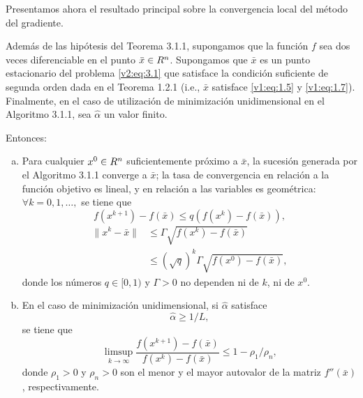 Presentamos ahora el resultado principal sobre la convergencia local del método del gradiente.

\begin{theorem}\label{v2:thm:3.1.4}
    Además de las hipótesis del Teorema 3.1.1, supongamos que la función $f$ sea dos veces diferenciable en el punto $\bar{x} \in R^n$. Supongamos que $\bar{x}$ es un punto estacionario del problema \eqref{v2:eq:3.1} que satisface la condición suficiente de segunda orden dada en el Teorema 1.2.1 (i.e., $\bar{x}$ satisface \eqref{v1:eq:1.5} y \eqref{v1:eq:1.7}). Finalmente, en el caso de utilización de minimización unidimensional en el Algoritmo 3.1.1, sea $\hat{\alpha}$ un valor finito.
    
    Entonces:
    \begin{enumerate}[(a)]
        \item Para cualquier $x^0 \in R^n$ suficientemente próximo a $\bar{x}$, la sucesión generada por el Algoritmo 3.1.1 converge a $\bar{x}$; la tasa de convergencia en relación a la función objetivo es lineal, y en relación a las variables es geométrica: $\forall k=0, 1, \dots,$ se tiene que
        \begin{equation}
            f(x^{k+1}) - f(\bar{x}) \le q(f(x^k) - f(\bar{x})),
            \label{v2:eq:3.29}
        \end{equation}
        \begin{align}
            \|x^k - \bar{x}\| &\le \Gamma \sqrt{f(x^k) - f(\bar{x})} \nonumber \\
            &\le (\sqrt{q})^k \Gamma \sqrt{f(x^0) - f(\bar{x})},
            \label{v2:eq:3.30}
        \end{align}
        donde los números $q \in [0, 1)$ y $\Gamma > 0$ no dependen ni de $k$, ni de $x^0$.
        
        \item En el caso de minimización unidimensional, si $\hat{\alpha}$ satisface
        \begin{equation}
            \hat{\alpha} \ge 1/L,
            \label{v2:eq:3.31}
        \end{equation}
        se tiene que
        \begin{equation}
            \limsup_{k \to \infty} \frac{f(x^{k+1}) - f(\bar{x})}{f(x^k) - f(\bar{x})} \le 1 - \rho_1/\rho_n,
            \label{v2:eq:3.32}
        \end{equation}
        donde $\rho_1 > 0$ y $\rho_n > 0$ son el menor y el mayor autovalor de la matriz $f''(\bar{x})$, respectivamente.
        

\end{enumerate}
\end{theorem}

